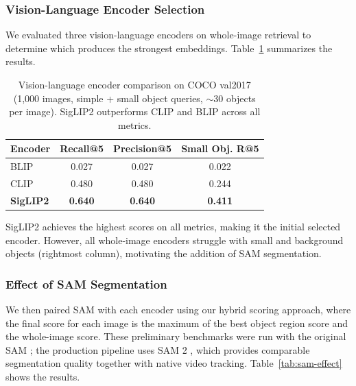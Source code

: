 \subsubsection{Vision-Language Encoder Selection}

We evaluated three vision-language encoders on whole-image retrieval to determine which produces the strongest embeddings. Table~\ref{tab:encoder-selection} summarizes the results.

\begin{table}[H]
    \centering
    \begin{tabular}{lccc}
        \toprule
        \textbf{Encoder} & \textbf{Recall@5} & \textbf{Precision@5} & \textbf{Small Obj. R@5} \\
        \midrule
        BLIP \cite{li2019blip} & 0.027 & 0.027 & 0.022 \\
        CLIP \cite{radford2021learning} & 0.480 & 0.480 & 0.244 \\
        \midrule
        \textbf{SigLIP2} \cite{zhai2025siglip2} & \textbf{0.640} & \textbf{0.640} & \textbf{0.411} \\
        \bottomrule
    \end{tabular}
    \caption{Vision-language encoder comparison on COCO val2017 (1,000 images, simple + small object queries, $\sim$30 objects per image). SigLIP2 outperforms CLIP and BLIP across all metrics.}
    \label{tab:encoder-selection}
\end{table}

SigLIP2 achieves the highest scores on all metrics, making it the initial selected encoder. However, all whole-image encoders struggle with small and background objects (rightmost column), motivating the addition of SAM segmentation.

\subsubsection{Effect of SAM Segmentation}

We then paired SAM with each encoder using our hybrid scoring approach, where the final score for each image is the maximum of the best object region score and the whole-image score. These preliminary benchmarks were run with the original SAM \cite{kirillov2023segment}; the production pipeline uses SAM 2 \cite{ravi2024sam2}, which provides comparable segmentation quality together with native video tracking. Table~\ref{tab:sam-effect} shows the results.

